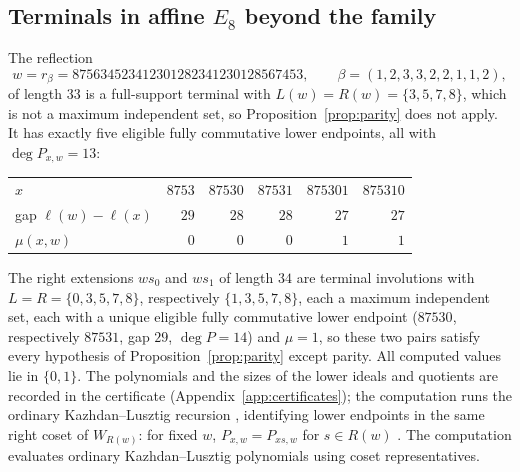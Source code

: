 \documentclass[10pt]{article}
\theoremstyle{remark}
\begin{document}
\subsection{Terminals in affine \texorpdfstring{$E_8$}{E8} beyond the family}
\label{sec:affineextra}
The reflection
\[
 w=r_\beta=875634523412301282341230128567453,\qquad
 \beta=(1,2,3,3,2,2,1,1,2),
\]
of length $33$ is a full-support terminal with $L(w)=R(w)=\{3,5,7,8\}$,
which is not a maximum independent set, so Proposition~\ref{prop:parity}
does not apply. It has exactly five eligible fully commutative lower
endpoints, all with $\deg P_{x,w}=13$:
\begin{center}\small
\begin{tabular}{@{}lrrrrr@{}}
\toprule
$x$ & $8753$ & $87530$ & $87531$ & $875301$ & $875310$\\
gap $\ell(w)-\ell(x)$ & $29$ & $28$ & $28$ & $27$ & $27$\\
$\mu(x,w)$ & $0$ & $0$ & $0$ & $1$ & $1$\\
\bottomrule
\end{tabular}
\end{center}
The right extensions $ws_0$ and $ws_1$ of length $34$ are terminal
involutions with $L=R=\{0,3,5,7,8\}$, respectively $\{1,3,5,7,8\}$, each a
maximum independent set, each with a unique eligible fully commutative
lower endpoint ($87530$, respectively $87531$, gap $29$, $\deg P=14$) and
$\mu=1$, so these two pairs satisfy every hypothesis of
Proposition~\ref{prop:parity} except parity. All computed values lie in
$\{0,1\}$. The polynomials and the sizes of the lower ideals and
quotients are recorded in the certificate
(Appendix~\ref{app:certificates}); the computation runs the
ordinary Kazhdan--Lusztig recursion \cite[Theorem~5.1.7]{BB}, identifying
lower endpoints in the same right coset of $W_{R(w)}$: for fixed $w$,
$P_{x,w}=P_{xs,w}$ for $s\in R(w)$ \cite[Proposition~5.1.8]{BB}.
The computation evaluates ordinary Kazhdan--Lusztig polynomials using
coset representatives.
\end{document}
